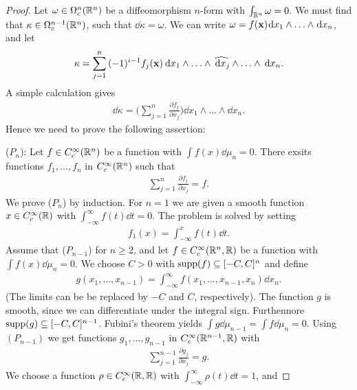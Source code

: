 \begin{proof}
  Let $\omega\in\Omega^n_c({\mathbb{R}}^n)$ be a diffeomorphism $n$-form with $\int_{{\mathbb{R}}^n}\omega=0$. We must find 
  that $\kappa\in\Omega^{n-1}_c({\mathbb{R}}^n)$, such that $\dd\kappa=\omega$. We can write $\omega=f(\FF{x})\dd x_1 \wedge\ldots\wedge\dd x_n$,
  and let 
  \begin{align*}
    \kappa = \sum_{j=1}^{n }{(-1)^{i-1}f_j(\FF{x})\dd x_1\wedge\ldots\wedge\widehat{\dd x_j}\wedge\ldots\wedge\dd x_n}. 
  \end{align*}
  A simple calculation gives 
  \begin{align*}
    \dd\kappa = \biggl(\sum_{j=1}^{n}{\frac{\partial f_j}{\partial x_j}}\biggr)\dd x_1\wedge\ldots\wedge\dd x_n.
  \end{align*}
  Hence we need to prove the following assertion:\par 
  ($P_n$): Let $f\in C_c^\infty({\mathbb{R}}^n)$ be a function with $\int f(x)\dd\mu_n = 0$. There exsits functions
  $f_1, \ldots, f_n$ in $C_c^\infty({\mathbb{R}}^n)$ such that
  \begin{align*}
    \sum_{j=1}^{n}{\frac{\partial f_j }{\partial x_j }} = f.
  \end{align*}
  We prove ($P_n$) by induction. For $n=1$ we are given a smooth function $x\in C_c^\infty({\mathbb{R}})$ 
  with $\int_{-\infty}^\infty f(t)\dd t = 0$. The problem is solved by setting 
  \begin{align*}
    f_1(x) = \int_{-\infty}^x f(t)\dd t.
  \end{align*}
  Assume that ($P_{n-1}$) for $n\ge 2$, and let $f\in C_c^\infty({\mathbb{R}}^n, {\mathbb{R}})$ be a function with $\int f(x)\dd\mu_n = 0$.
  We choose $C>0$ with $\operatorname{supp}(f)\subseteq [-C, C]^n$ and define 
  \begin{align}\label{eq:10-9}
    g(x_1, \ldots, x_{n-1}) = \int_{-\infty}^{\infty} f(x_1, \ldots, x_{n-1}, x_n)\dd x_n.
  \end{align}
  (The limits can be be replaced by $-C$ and $C$, respectively). The function $g$ is smooth, 
  since we can differentiate under the integral sign. Furthennore $\operatorname{supp}(g)\subseteq [-C, C]^{n-1}$. 
  Fubini's theorem yields $\int g\dd\mu_{n-1} = \int f\dd\mu_n = 0$. Using $(P_{n-1})$ we get functions 
  $g_1, \ldots, g_{n-1}$ in $C_c^\infty({\mathbb{R}}^{n-1}, {\mathbb{R}})$ with 
  \begin{align}\label{eq:10-10}
    \sum_{j=1}^{n-1}{\frac{\partial g_j}{\partial x_j}} = g.
  \end{align}
  We choose a function $\rho\in C_c^\infty({\mathbb{R}}, {\mathbb{R}})$ with $\int_{-\infty}^\infty \rho(t)\dd t = 1$, and 

\end{proof}
